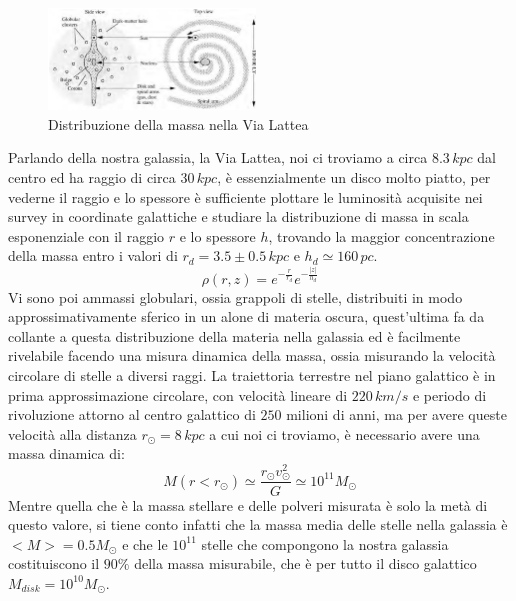 \documentclass[a4paper,twoside,openany,notitlepage]{book}
\theoremstyle{definition}
\theoremstyle{plain}
\begin{document}
\begin{figure}
	\vspace{-5pt}
	\centering
	\includegraphics[width=0.49\textwidth]{./Immagini/Capitolo1/Via_Lattea_distr.png}
	\caption*{Distribuzione della massa nella Via Lattea}
	\vspace{-15pt}
\end{figure}

Parlando della nostra galassia, la Via Lattea, noi ci troviamo a circa $8.3\,kpc$ dal centro ed ha raggio di circa $30\,kpc$, è essenzialmente un disco molto piatto, per vederne il raggio e lo spessore è sufficiente plottare le luminosità acquisite nei survey in coordinate galattiche e studiare la distribuzione di massa in scala esponenziale con il raggio $r$ e lo spessore $h$, trovando la maggior concentrazione della massa entro i valori di $r_d=3.5\pm0.5\,kpc$ e $h_d\simeq160\,pc$.
\begin{equation*}
	\rho(r,z) = e^{ -\frac{r}{r_d}} e^{-\frac{|z|}{h_d}}
\end{equation*}
Vi sono poi ammassi globulari, ossia grappoli di stelle, distribuiti in modo approssimativamente sferico in un alone di materia oscura, quest'ultima fa da collante a questa distribuzione della materia nella galassia ed è facilmente rivelabile facendo una misura dinamica della massa, ossia misurando la velocità circolare di stelle a diversi raggi. La traiettoria terrestre nel piano galattico è in prima approssimazione circolare, con velocità lineare di $220\,km/s$ e periodo di rivoluzione attorno al centro galattico di $250$ milioni di anni, ma per avere queste velocità alla distanza $r_\odot=8\,kpc$ a cui noi ci troviamo, è necessario avere una massa dinamica di:
\begin{equation*}
	M(r<r_\odot) \simeq \frac{r_\odot v_\odot^2}{G} \simeq 10^{11}M_\odot
\end{equation*}
Mentre quella che è la massa stellare e delle polveri misurata è solo la metà di questo valore, si tiene conto infatti che la massa media delle stelle nella galassia è $<M>=0.5M_\odot$ e che le $10^{11}$ stelle che compongono la nostra galassia costituiscono il $90\%$ della massa misurabile, che è per tutto il disco galattico $M_{disk}=10^{10}M_\odot$.
\end{document}
